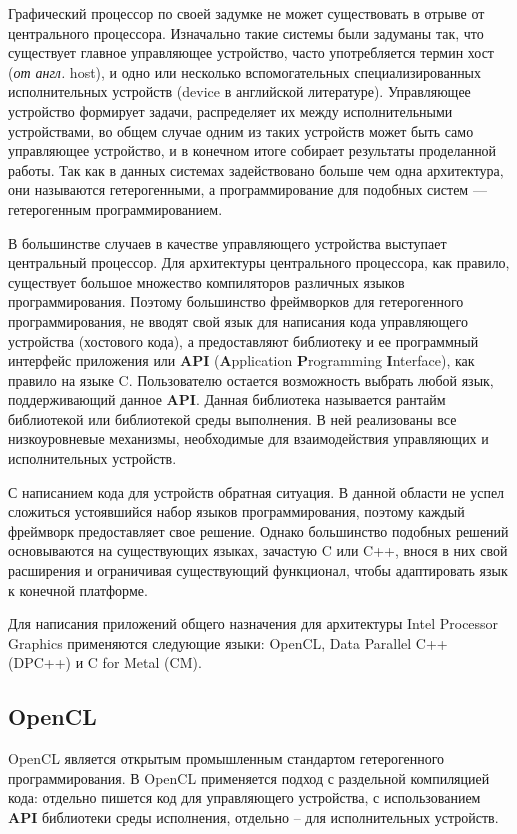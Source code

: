 Графический процессор по своей задумке не может существовать в отрыве от центрального процессора.
Изначально такие системы были задуманы так, что существует главное управляющее устройство, часто употребляется термин хост (\textit{от англ.} host), и одно или несколько вспомогательных специализированных исполнительных устройств (device в английской литературе).
Управляющее устройство формирует задачи, распределяет их между исполнительными устройствами, во общем случае одним из таких устройств может быть само управляющее устройство, и в конечном итоге собирает результаты проделанной работы.
Так как в данных системах задействовано больше чем одна архитектура, они называются гетерогенными, а программирование для подобных систем --- гетерогенным программированием.

В большинстве случаев в качестве управляющего устройства выступает центральный процессор.
Для архитектуры центрального процессора, как правило, существует большое множество компиляторов различных языков программирования.
Поэтому большинство фреймворков для гетерогенного программирования, не вводят свой язык для написания кода управляющего устройства (хостового кода), а предоставляют библиотеку и ее программный интерфейс приложения или \textbf{API} (\foreignlanguage{english}{\textbf{A}pplication \textbf{P}rogramming \textbf{I}nterface}), как правило на языке C.
Пользователю остается возможность выбрать любой язык, поддерживающий данное \textbf{API}.
Данная библиотека называется рантайм библиотекой или библиотекой среды выполнения.
В ней реализованы все низкоуровневые механизмы, необходимые для взаимодействия управляющих и исполнительных устройств.


С написанием кода для устройств обратная ситуация. В данной области не успел сложиться устоявшийся набор языков программирования, поэтому каждый фреймворк предоставляет свое решение.
Однако большинство подобных решений основываются на существующих языках, зачастую C или C++, внося в них свой расширения и ограничивая существующий функционал, чтобы адаптировать язык к конечной платформе.

Для написания приложений общего назначения для архитектуры \foreignlanguage{english}{Intel Processor Graphics} применяются следующие языки: OpenCL, Data Parallel C++ (DPC++) и C for Metal (CM).


\subsection{OpenCL}

OpenCL является открытым промышленным стандартом гетерогенного программирования\cite{opencl20}.
В OpenCL применяется подход с раздельной компиляцией кода: отдельно пишется код для управляющего устройства, с использованием \textbf{API} библиотеки среды исполнения, отдельно -- для исполнительных устройств.

